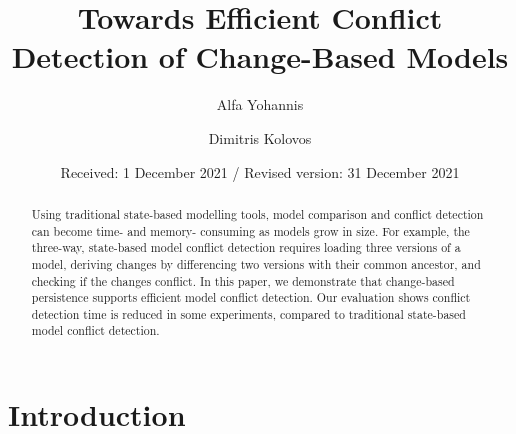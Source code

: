 
\renewcommand{\labelitemi}{$\bullet$}
\newcommand{\AndA}{\textnormal{\textbf{and }}}
\newcommand{\Is}{\textnormal{\textbf{is }}}
\newcommand{\Not}{\textnormal{\textbf{not }}}
\newcommand{\In}{\textnormal{\textbf{in }}}
\newcommand{\Or}{\textnormal{\textbf{or }}}
\newcommand{\eqnum}{\refstepcounter{equation}\textup{\tagform@{\theequation}}}

%
%

%
\title{Towards Efficient Conflict Detection of Change-Based Models}
\author{Alfa Yohannis 
	\and Dimitris Kolovos%
}                     %
%
\offprints{}          %
%
%
\date{Received: 1 December 2021 / Revised version: 31 December 2021}
%
\maketitle
%
\begin{abstract}
Using traditional state-based modelling tools, model comparison and conflict detection can become time- and memory- consuming as models grow in size. For example, the three-way, state-based model conflict detection requires loading three versions of a model, deriving changes by differencing two versions with their common ancestor, and checking if the changes conflict. In this paper, we demonstrate that change-based persistence supports efficient model conflict detection. Our evaluation shows conflict detection time is reduced in some experiments, compared to traditional state-based model conflict detection.
\end{abstract}
%

\section{Introduction}
\label{sec:introduction}

